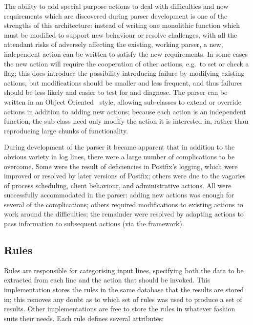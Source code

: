 \documentclass[draft]{svmult}
\begin{document}
The ability to add special purpose actions to deal with difficulties and
new requirements which are discovered during parser development is one of
the strengths of this architecture: instead of writing one monolithic
function which must be modified to support new behaviour or resolve
challenges, with all the attendant risks of adversely affecting the
existing, working parser, a new, independent action can be written to
satisfy the new requirements.  In some cases the new action will require
the cooperation of other actions, e.g.\ to set or check a flag; this does
introduce the possibility introducing failure by modifying existing
actions, but modifications should be smaller and less frequent, and thus
failures should be less likely and easier to test for and diagnose.  The
parser can be written in an Object
Oriented~\cite{Wikipedia-object-orientation} style, allowing sub-classes to
extend or override actions in addition to adding new actions; because each
action is an independent function, the sub-class need only modify the
action it is interested in, rather than reproducing large chunks of
functionality.

\label{complications}

During development of the parser it became apparent that in addition to the
obvious variety in log lines, there were a large number of complications to
be overcome.  Some were the result of
deficiencies in Postfix's logging, which were improved or resolved by later
versions of Postfix; others were due to the vagaries of process scheduling,
client behaviour, and administrative actions.  All were successfully
accommodated in the parser: adding new actions was enough for several of
the complications; others required modifications to existing actions to
work around the difficulties; the remainder were resolved by adapting
actions to pass information to subsequent actions (via the framework).


\subsection{Rules}

\label{Rules}

Rules are responsible for categorising input lines, specifying both the
data to be extracted from each line and the action that should be invoked.
This implementation stores the rules in the same \SQL{} database that the
results are stored in; this removes any doubt as to which set of rules was
used to produce a set of results.  Other implementations are free to store
the rules in whatever fashion suits their needs.  Each rule defines several
attributes:
\end{document}
